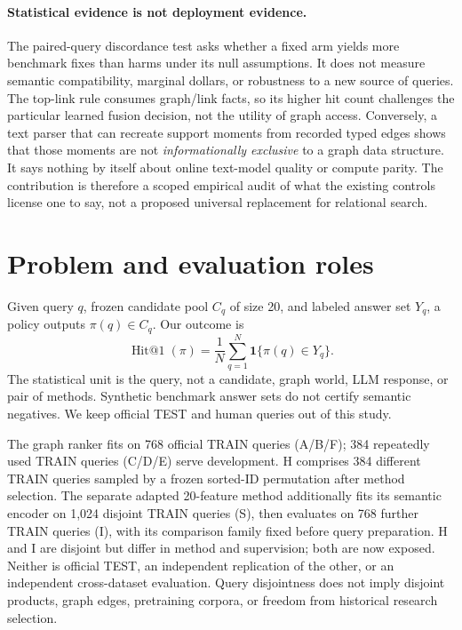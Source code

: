 \documentclass{article}
\begin{document}
\paragraph{Statistical evidence is not deployment evidence.}
The paired-query discordance test asks whether a fixed arm yields more
benchmark fixes than harms under its null assumptions. It does not
measure semantic compatibility, marginal dollars, or robustness to a
new source of queries. The top-link rule consumes graph/link facts, so
its higher hit count challenges the particular learned fusion decision,
not the utility of graph access. Conversely, a text parser that can
recreate support moments from recorded typed edges shows that those
moments are not \emph{informationally exclusive} to a graph data
structure. It says nothing by itself about online text-model quality
or compute parity. The contribution is therefore a scoped empirical
audit of what the existing controls license one to say, not a proposed
universal replacement for relational search.

\section{Problem and evaluation roles}
Given query $q$, frozen candidate pool $C_q$ of size 20, and labeled answer
set $Y_q$, a policy outputs $\pi(q)\in C_q$. Our outcome is
\begin{equation}
  \operatorname{Hit@1}(\pi)=\frac{1}{N}\sum_{q=1}^{N}
  \mathbf{1}\{\pi(q)\in Y_q\}.
\end{equation}
The statistical unit is the query, not a candidate, graph world, LLM response,
or pair of methods. Synthetic benchmark answer sets do not certify semantic
negatives. We keep official TEST and human queries out of this study.

The graph ranker fits on 768 official TRAIN queries (A/B/F); 384 repeatedly
used TRAIN queries (C/D/E) serve development. H comprises 384 different TRAIN
queries sampled by a frozen sorted-ID permutation after method selection.
The separate adapted 20-feature method additionally fits its semantic encoder
on 1,024 disjoint TRAIN queries (S), then evaluates on 768 further TRAIN
queries (I), with its comparison family fixed before query preparation. H and I
are disjoint but differ in method and supervision; both are now exposed. Neither
is official TEST, an independent replication of the other, or an independent
cross-dataset evaluation. Query disjointness does not imply disjoint products,
graph edges, pretraining corpora, or freedom from historical research selection.
\end{document}
